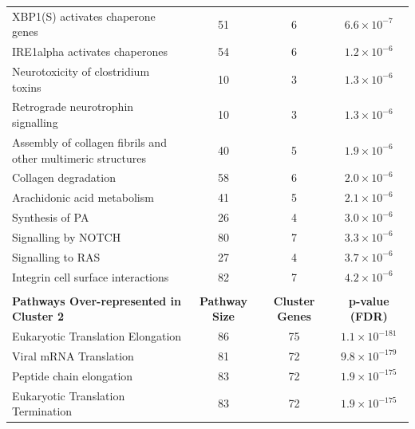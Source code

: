\begin{table}[!hp]
{\begin{threeparttable}
\begin{tabular}{lccc}
  XBP1(S) activates chaperone genes &  51 &   6 & $6.6 \times 10^{-7}$ \\
  \rowcolor{Cluster_Blue!20} 
  IRE1alpha activates chaperones &  54 &   6 & $1.2 \times 10^{-6}$ \\
  \rowcolor{Cluster_Blue!15} 
  Neurotoxicity of clostridium toxins &  10 &   3 & $1.3 \times 10^{-6}$ \\
  \rowcolor{Cluster_Blue!20} 
  Retrograde neurotrophin signalling &  10 &   3 & $1.3 \times 10^{-6}$ \\
  \rowcolor{Cluster_Blue!15} 
  Assembly of collagen fibrils and other multimeric structures &  40 &   5 & $1.9 \times 10^{-6}$ \\
  \rowcolor{Cluster_Blue!20} 
  Collagen degradation &  58 &   6 & $2.0 \times 10^{-6}$ \\
  \rowcolor{Cluster_Blue!15} 
  Arachidonic acid metabolism &  41 &   5 & $2.1 \times 10^{-6}$ \\
  \rowcolor{Cluster_Blue!20} 
  Synthesis of PA &  26 &   4 & $3.0 \times 10^{-6}$ \\
  \rowcolor{Cluster_Blue!15} 
  Signalling by NOTCH &  80 &   7 & $3.3 \times 10^{-6}$ \\
  \rowcolor{Cluster_Blue!20} 
  Signalling to RAS &  27 &   4 & $3.7 \times 10^{-6}$ \\
  \rowcolor{Cluster_Blue!15} 
  Integrin cell surface interactions &  82 &   7 & $4.2 \times 10^{-6}$ \\
  \hline
  \\
  \cellcolor{white} \large{\textbf{Pathways Over-represented in Cluster 2}} & \large{\textbf{Pathway Size}} & \large{\textbf{Cluster Genes}} & \large{\textbf{p-value (\gls{FDR})}} \\ %
  \hline
  \rowcolor{Cluster_Green!20}
  Eukaryotic Translation Elongation &  86 &  75 & $1.1 \times 10^{-181}$ \\
  \rowcolor{Cluster_Green!15} 
  Viral \acrshort{mRNA} Translation &  81 &  72 & $9.8 \times 10^{-179}$ \\
  \rowcolor{Cluster_Green!20} 
  Peptide chain elongation &  83 &  72 & $1.9 \times 10^{-175}$ \\
  \rowcolor{Cluster_Green!15} 
  Eukaryotic Translation Termination &  83 &  72 & $1.9 \times 10^{-175}$ \\

\end{tabular}
\end{threeparttable}}
\end{table}
